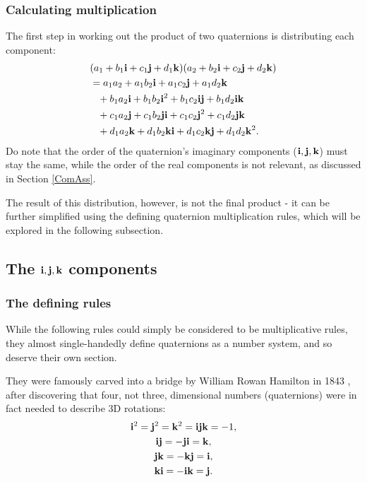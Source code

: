 \documentclass[10pt]{article}
\begin{document}
\subsubsection{Calculating multiplication} \label{InitialMult}

The first step in working out the product of two quaternions is distributing each component:
\begin{equation}
    \begin{aligned}
        & (a_1 + b_1\vb{i} + c_1\vb{j} + d_1\vb{k})(a_2 + b_2\vb{i} + c_2\vb{j} + d_2\vb{k}) \\
        & = a_1a_2 + a_1b_2\vb{i} + a_1c_2\vb{j} + a_1d_2\vb{k} \\
        & \phantom{=} + b_1a_2\vb{i} + b_1b_2\vb{i}^2 + b_1c_2\vb{i}\vb{j} + b_1d_2\vb{i}\vb{k} \\
        & \phantom{=} + c_1a_2\vb{j} + c_1b_2\vb{j}\vb{i} + c_1c_2\vb{j}^2 + c_1d_2\vb{j}\vb{k} \\
        & \phantom{=} + d_1a_2\vb{k} + d_1b_2\vb{k}\vb{i} + d_1c_2\vb{k}\vb{j} + d_1d_2\vb{k}^2.
    \end{aligned}
\end{equation}
Do note that the order of the quaternion's imaginary components ($\vb{i, j, k}$) must stay the same, while the order of the real components is not relevant, as discussed in Section \ref{ComAss}.

The result of this distribution, however, is not the final product - it can be further simplified using the defining quaternion multiplication rules, which will be explored in the following subsection.

\subsection{The $\vb{i, j, k}$ components}

\subsubsection{The defining rules}

While the following rules \cite{Eater} could simply be considered to be multiplicative rules, they almost single-handedly define quaternions as a number system, and so deserve their own section.

They were famously carved into a bridge by William Rowan Hamilton in 1843 \cite{QuaternionWiki}, after discovering that four, not three, dimensional numbers (quaternions) were in fact needed to describe 3D rotations:
\begin{subequations} \label{MultProperties1}
    \begin{gather}
        \vb{i}^2 = \vb{j}^2 = \vb{k}^2 = \vb{i}\vb{j}\vb{k} = -1, \\
        \vb{ij} = -\vb{ji} = \vb{k}, \\
        \vb{jk} = -\vb{kj} = \vb{i}, \\
        \vb{ki} = -\vb{ik} = \vb{j}.
    \end{gather}
\end{subequations}
\end{document}
